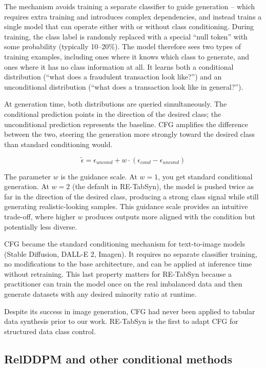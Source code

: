 The mechanism avoids training a separate classifier to guide generation -- which requires extra training and introduces complex dependencies, and instead trains a single model that can operate either with or without class conditioning. During training, the class label is randomly replaced with a special ``null token'' with some probability (typically 10--20\%). The model therefore sees two types of training examples, including ones where it knows which class to generate, and ones where it has no class information at all. It learns both a conditional distribution (``what does a fraudulent transaction look like?'') and an unconditional distribution (``what does a transaction look like in general?'').

At generation time, both distributions are queried simultaneously. The conditional prediction points in the direction of the desired class; the unconditional prediction represents the baseline. CFG amplifies the difference between the two, steering the generation more strongly toward the desired class than standard conditioning would.

\begin{equation}
\tilde{\epsilon} = \epsilon_{uncond} + w \cdot (\epsilon_{cond} - \epsilon_{uncond})
\end{equation}

The parameter $w$ is the guidance scale. At $w = 1$, you get standard conditional generation. At $w = 2$ (the default in RE-TabSyn), the model is pushed twice as far in the direction of the desired class, producing a strong class signal while still generating realistic-looking samples. This guidance scale provides an intuitive trade-off, where higher $w$ produces outputs more aligned with the condition but potentially less diverse.

CFG became the standard conditioning mechanism for text-to-image models (Stable Diffusion, DALL-E 2, Imagen). It requires no separate classifier training, no modifications to the base architecture, and can be applied at inference time without retraining. This last property matters for RE-TabSyn because a practitioner can train the model once on the real imbalanced data and then generate datasets with any desired minority ratio at runtime.

Despite its success in image generation, CFG had never been applied to tabular data synthesis prior to our work. RE-TabSyn is the first to adapt CFG for structured data class control.

\subsection{RelDDPM and other conditional methods}

